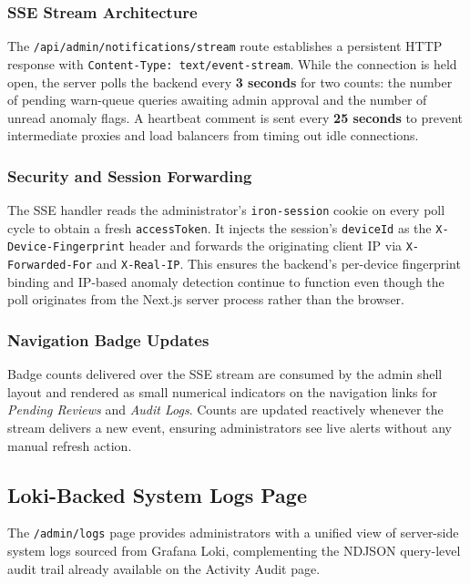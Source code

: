 \subsubsection{SSE Stream Architecture}
The \texttt{/api/admin/notifications/stream} route establishes a persistent HTTP response with \texttt{Content-Type: text/event-stream}. While the connection is held open, the server polls the backend every \textbf{3 seconds} for two counts: the number of pending warn-queue queries awaiting admin approval and the number of unread anomaly flags. A heartbeat comment is sent every \textbf{25 seconds} to prevent intermediate proxies and load balancers from timing out idle connections.

\subsubsection{Security and Session Forwarding}
The SSE handler reads the administrator's \texttt{iron-session} cookie on every poll cycle to obtain a fresh \texttt{accessToken}. It injects the session's \texttt{deviceId} as the \texttt{X-Device-Fingerprint} header and forwards the originating client IP via \texttt{X-Forwarded-For} and \texttt{X-Real-IP}. This ensures the backend's per-device fingerprint binding and IP-based anomaly detection continue to function even though the poll originates from the Next.js server process rather than the browser.

\subsubsection{Navigation Badge Updates}
Badge counts delivered over the SSE stream are consumed by the admin shell layout and rendered as small numerical indicators on the navigation links for \emph{Pending Reviews} and \emph{Audit Logs}. Counts are updated reactively whenever the stream delivers a new event, ensuring administrators see live alerts without any manual refresh action.


\subsection{Loki-Backed System Logs Page}

The \texttt{/admin/logs} page provides administrators with a unified view of server-side system logs sourced from Grafana Loki, complementing the NDJSON query-level audit trail already available on the Activity Audit page.

